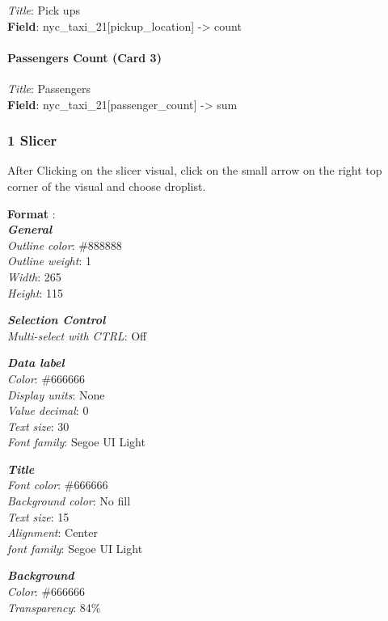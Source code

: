 \documentclass[
]{book}
\begin{document}
\emph{Title}: Pick ups\\
\textbf{Field}: nyc\_taxi\_21{[}pickup\_location{]} -\textgreater{} count

\hypertarget{passengers-count-card-3}{%
\paragraph{Passengers Count (Card 3)}\label{passengers-count-card-3}}

\emph{Title}: Passengers\\
\textbf{Field}: nyc\_taxi\_21{[}passenger\_count{]} -\textgreater{} sum

\hypertarget{slicer}{%
\subsubsection{1 Slicer}\label{slicer}}

After Clicking on the slicer visual, click on the small arrow on the right top corner of the visual and choose droplist.

\textbf{Format} :\\
\textbf{\emph{General}}\\
\emph{Outline color}: \#888888\\
\emph{Outline weight}: 1\\
\emph{Width}: 265\\
\emph{Height}: 115

\textbf{\emph{Selection Control}}\\
\emph{Multi-select with CTRL}: Off

\textbf{\emph{Data label}}\\
\emph{Color}: \#666666\\
\emph{Display units}: None\\
\emph{Value decimal}: 0\\
\emph{Text size}: 30\\
\emph{Font family}: Segoe UI Light

\textbf{\emph{Title}}\\
\emph{Font color}: \#666666\\
\emph{Background color}: No fill\\
\emph{Text size}: 15\\
\emph{Alignment}: Center\\
\emph{font family}: Segoe UI Light

\textbf{\emph{Background}}\\
\emph{Color}: \#666666\\
\emph{Transparency}: 84\%
\end{document}
